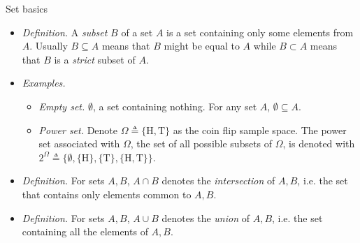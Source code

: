 \documentclass{beamer}
\numberwithin{equation}{section}
\begin{document}
\begin{frame}{Set basics}
    \begin{itemize}
        \item
        \textit{Definition.} A \textit{subset} $ B $ of a set $ A $ is a set
        containing only some elements from $ A $. Usually $ B \subseteq A $
        means that $ B $ might be equal to $ A $ while $ B \subset A $ means
        that $ B $ is a \textit{strict} subset of $ A $.

        \item
        \textit{Examples.}
        \begin{itemize}
            \item
            \textit{Empty set.} $ \emptyset $, a set containing nothing. For
            any set $ A $, $ \emptyset \subseteq A $.

            \item
            \textit{Power set.} Denote $ \Omega \triangleq \{\text{H},
            \text{T}\} $ as the coin flip sample space. The power set
            associated with $ \Omega $, the set of all possible subsets of
            $ \Omega $, is denoted with $ 2^\Omega \triangleq \{\emptyset,
            \{\text{H}\}, \{\text{T}\}, \{\text{H}, \text{T}\}\} $.
        \end{itemize}

        \item
        \textit{Definition.} For sets $ A, B $, $ A \cap B $ denotes the 
        \textit{intersection} of $ A, B $, i.e. the set that contains only
        elements common to $ A, B $.

        \item
        \textit{Definition.} For sets $ A, B $, $ A \cup B $ denotes the
        \textit{union} of $ A, B $, i.e. the set containing all the elements
        of $ A, B $.
    \end{itemize}
\end{frame}
\end{document}
